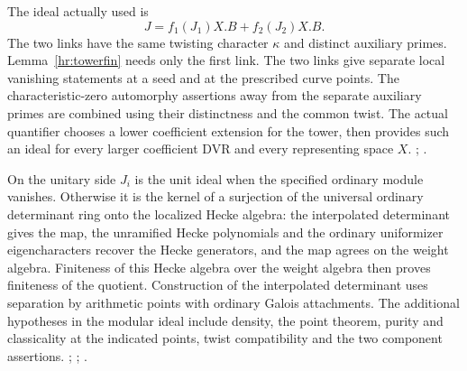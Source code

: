 The ideal actually used is
\[
 J=f_1(J_1)X.B+f_2(J_2)X.B .
\]
The two links have the same twisting character \(\kappa\) and
distinct auxiliary primes. Lemma~\ref{hr:towerfin} needs only
the first link. The two links give separate local vanishing
statements at a seed and at the prescribed curve points. The
characteristic-zero automorphy assertions away from the separate
auxiliary primes are combined using their distinctness and the
common twist. The actual quantifier chooses a lower coefficient
extension for the tower, then provides such an ideal for every
larger coefficient DVR and every representing space \(X\).
;
.

On the unitary side \(J_i\) is the unit ideal when the specified
ordinary module vanishes. Otherwise it is the kernel of a
surjection of the universal ordinary determinant ring onto the
localized Hecke algebra: the interpolated determinant gives the
map, the unramified Hecke polynomials and the ordinary uniformizer
eigencharacters recover the Hecke generators, and the map agrees
on the weight algebra. Finiteness of this Hecke algebra over the
weight algebra then proves finiteness of the quotient. Construction
of the interpolated determinant uses separation by arithmetic
points with ordinary Galois attachments. The additional hypotheses
in the modular ideal include density, the point theorem,
purity and classicality at the indicated points, twist compatibility
and the two component assertions.
;
;
.

